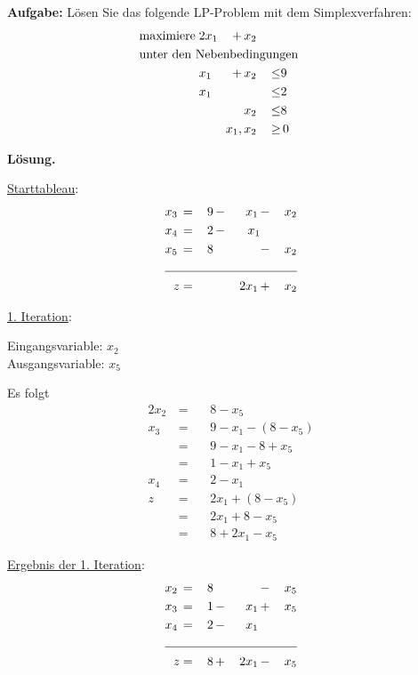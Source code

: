\documentclass[10pt,a4paper,oneside,ngerman,numbers=noenddot]{scrartcl}
\begin{document}
			\textbf{Aufgabe:} Lösen Sie das folgende LP-Problem mit dem Simplexverfahren:
		\begin{alignat*}{3}
			\text{maximiere}\; & 2x_{1} \,&+&\, x_{2} && \\
			\multicolumn{6}{l}{\text{unter den Nebenbedingungen}} && \\
			\;& x_{1} \,&+&\, x_{2} \,&\leq & 9 \\
			\;& x_{1} \,&& &\leq & 2 \\
			\;& &&\, x_{2} \,&\leq & 8 \\
			\multicolumn{4}{r}{$x_{1}, x_{2}$} \,&\geq &\, 0
		\end{alignat*}
		
		\textbf{Lösung.}
		
		\underline{Starttableau}:
		\begin{alignat*}{4}
			x_{3} \,&=&\, 9 \,&-&\, x_{1} \,&-&\, x_{2} \\
			x_{4} \,&=&\, 2 \,&-&\, x_{1} && \\
			x_{5} \,&=&\, 8 \,&& &-&\, x_{2} \\ \cline{1 - 7}
			z &=& &&\, 2x_{1} \,&+&\, x_{2}
		\end{alignat*}
		
		\underline{1. Iteration}:
		
		Eingangsvariable: $x_{2}$\\
		Ausgangsvariable: $x_{5}$
		
		Es folgt
		\begin{alignat*}{2}
			x_{2} \,&=&&\, 8 - x_{5} \\
			x_{3} \,&=&&\, 9 - x_{1} - \left(8 - x_{5}\right) \\
			&=&&\, 9 - x_{1} - 8 + x_{5} \\
			&=&&\, 1 - x_{1} + x_{5} \\
			x_{4} \,&=&&\, 2 - x_{1} \\
			z \,&=&&\, 2x_{1} + \left(8 - x_{5}\right) \\
			&=&&\, 2x_{1} + 8 - x_{5} \\
			&=&&\, 8 + 2x_{1} - x_{5}
		\end{alignat*}
		
		\underline{Ergebnis der 1. Iteration}:
		\begin{alignat*}{4}
			x_{2} \,&=&\, 8 \,&& &-&\, x_{5} \\
			x_{3} \,&=&\, 1 \,&-&\, x_{1} \,&+&\, x_{5} \\
			x_{4} \,&=&\, 2 \,&-&\, x_{1} \,&& \\ \cline{1 - 7}
			z &=& 8 \,&+&\, 2x_{1} \,&-&\, x_{5}
		\end{alignat*}
		
\end{document}
